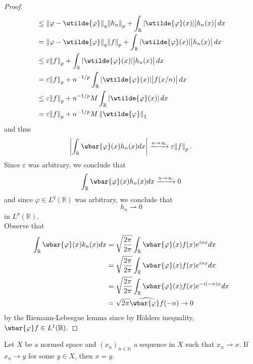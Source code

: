 \begin{enumerate}[label = \textbf{Exercise \arabic*.},wide = 0pt, itemsep = 1.5ex]
\begin{proof}
\begin{align*}
				&\leq \norm[0]{\varphi - \wtilde{\varphi}}_q\norm{h_n}_p + \int_\mathbb{R}\abs[0]{\wtilde{\varphi}(x)}\abs{h_n(x)}dx\\
				&= \norm[0]{\varphi - \wtilde{\varphi}}_q\norm{f}_p + \int_\mathbb{R}\abs[0]{\wtilde{\varphi}(x)}\abs{h_n(x)}dx\\
				&\leq \varepsilon\norm{f}_p + \int_\mathbb{R}\abs[0]{\wtilde{\varphi}(x)}\abs{h_n(x)}dx\\
				&= \varepsilon\norm{f}_p +n^{-1/p} \int_\mathbb{R}\abs[0]{\wtilde{\varphi}(x)}\abs{f(x/n)}dx\\
				&\leq \varepsilon\norm{f}_p +n^{-1/p}M \int_\mathbb{R}\abs[0]{\wtilde{\varphi}(x)}dx\\
				&= \varepsilon\norm{f}_p +n^{-1/p}M\norm[0]{\wtilde{\varphi}}_1
			\end{align*}
			\noindent and thus
			\begin{equation*}
				\abs[3]{\int_\mathbb{R}\wbar{\varphi}(x)h_n(x)dx} \xrightarrow{n \to \infty} \varepsilon\norm{f}_p.
			\end{equation*}
			Since $\varepsilon$ was arbitrary, we conclude that
			\begin{equation*}
				\int_\mathbb{R}\wbar{\varphi}(x)h_n(x)dx \xrightarrow{n \to \infty} 0
			\end{equation*}
			\noindent and since $\varphi \in L^q(\mathbb{R})$ was arbitrary, we conclude that
			\begin{equation*}
				h_n \rightharpoonup 0
			\end{equation*}
			\noindent in $L^p(\mathbb{R})$.\\
			Observe that
			\begin{align*}
				\int_\mathbb{R} \wbar{\varphi}(x)k_n(x)dx &= \sqrt{\frac{2\pi}{2\pi}} \int_\mathbb{R} \wbar{\varphi}(x)f(x)e^{inx}dx\\
				&= \sqrt{\frac{2\pi}{2\pi}} \int_\mathbb{R} \wbar{\varphi}(x)f(x)e^{inx}dx\\
				&= \sqrt{\frac{2\pi}{2\pi}} \int_\mathbb{R} \wbar{\varphi}(x)f(x)e^{-i(-n)x}dx\\
				&= \sqrt{2\pi} \widehat{\wbar{\varphi}f}(-n) \to 0
			\end{align*}
			\noindent by the Riemann-Lebesgue lemma since by H\"olders inequality, $\wbar{\varphi}f \in L^1(\mathbb{R})$.
		\end{proof}

		\begin{lemma}
			Let $X$ be a normed space and $(x_n)_{n \in \mathbb{N}}$ a sequence in $X$ such that $x_n \rightharpoonup x$. If $x_n \to y$ for some $y \in X$, then $x = y$.
		\end{lemma}


\end{enumerate}
